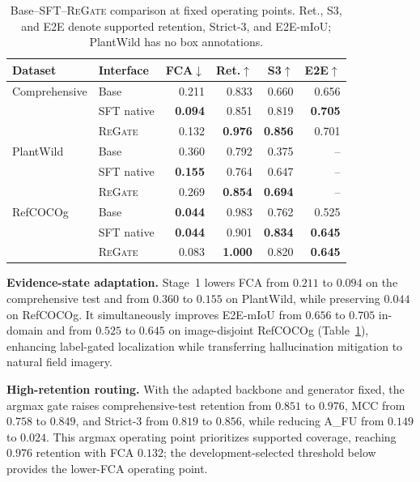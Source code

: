 \documentclass[letterpaper]{article}
\newcommand{\Method}{\textsc{ReGate}\xspace}
\begin{document}
\begin{table}[t]
\centering
\small
\setlength{\tabcolsep}{1mm}
\begin{tabular*}{\columnwidth}{@{\extracolsep{\fill}}llrrrr@{}}
\toprule
Dataset & Interface & FCA$\downarrow$ & Ret.$\uparrow$ & S3$\uparrow$ & E2E$\uparrow$ \\
\midrule
Comprehensive & Base & 0.211 & 0.833 & 0.660 & 0.656 \\
 & SFT native & \textbf{0.094} & 0.851 & 0.819 & \textbf{0.705} \\
 & \Method & 0.132 & \textbf{0.976} & \textbf{0.856} & 0.701 \\
\midrule
PlantWild & Base & 0.360 & 0.792 & 0.375 & -- \\
 & SFT native & \textbf{0.155} & 0.764 & 0.647 & -- \\
 & \Method & 0.269 & \textbf{0.854} & \textbf{0.694} & -- \\
\midrule
RefCOCOg & Base & \textbf{0.044} & 0.983 & 0.762 & 0.525 \\
 & SFT native & \textbf{0.044} & 0.901 & \textbf{0.834} & \textbf{0.645} \\
 & \Method & 0.083 & \textbf{1.000} & 0.820 & \textbf{0.645} \\
\bottomrule
\end{tabular*}
\caption{Base--SFT--\Method comparison at fixed operating points. Ret., S3, and E2E denote supported retention, Strict-3, and E2E-mIoU; PlantWild has no box annotations.}
\label{tab:main_results}
\end{table}

\textbf{Evidence-state adaptation.}
Stage~1 lowers FCA from $0.211$ to $0.094$ on the comprehensive test and from $0.360$ to $0.155$ on PlantWild, while preserving $0.044$ on RefCOCOg. It simultaneously improves E2E-mIoU from $0.656$ to $0.705$ in-domain and from $0.525$ to $0.645$ on image-disjoint RefCOCOg (Table~\ref{tab:main_results}), enhancing label-gated localization while transferring hallucination mitigation to natural field imagery.

\textbf{High-retention routing.}
With the adapted backbone and generator fixed, the argmax gate raises comprehensive-test retention from $0.851$ to $0.976$, MCC from $0.758$ to $0.849$, and Strict-3 from $0.819$ to $0.856$, while reducing A\_FU from $0.149$ to $0.024$. 
This argmax operating point prioritizes supported coverage, reaching $0.976$ retention with FCA $0.132$; the development-selected threshold below provides the lower-FCA operating point.
\end{document}
